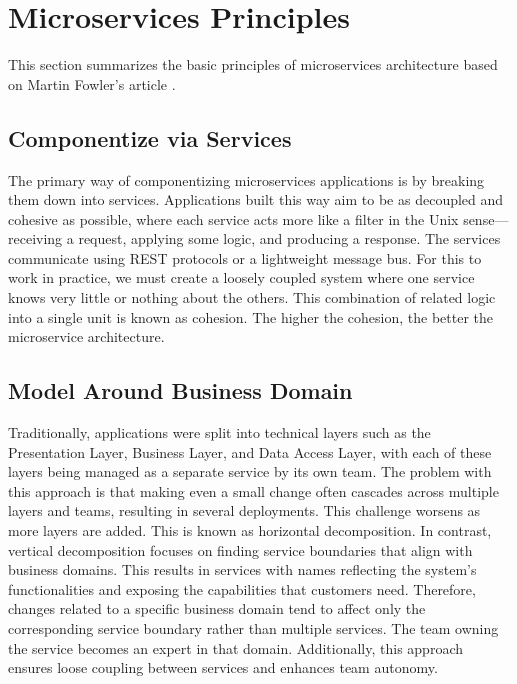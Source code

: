 \section{Microservices Principles}
This section summarizes the basic principles of microservices architecture based on Martin Fowler's article \cite{Fowler}.

\subsection{Componentize via Services}
The primary way of componentizing microservices applications is by breaking them down into services. Applications built this way aim to be as decoupled and cohesive as possible, where each service acts more like a filter in the Unix sense—receiving a request, applying some logic, and producing a response. The services communicate using REST protocols or a lightweight message bus. For this to work in practice, we must create a loosely coupled system where one service knows very little or nothing about the others. This combination of related logic into a single unit is known as cohesion. The higher the cohesion, the better the microservice architecture.

\subsection{Model Around Business Domain}
Traditionally, applications were split into technical layers such as the Presentation Layer, Business Layer, and Data Access Layer, with each of these layers being managed as a separate service by its own team. The problem with this approach is that making even a small change often cascades across multiple layers and teams, resulting in several deployments. This challenge worsens as more layers are added. This is known as horizontal decomposition. In contrast, vertical decomposition focuses on finding service boundaries that align with business domains. This results in services with names reflecting the system's functionalities and exposing the capabilities that customers need. Therefore, changes related to a specific business domain tend to affect only the corresponding service boundary rather than multiple services. The team owning the service becomes an expert in that domain. Additionally, this approach ensures loose coupling between services and enhances team autonomy.


